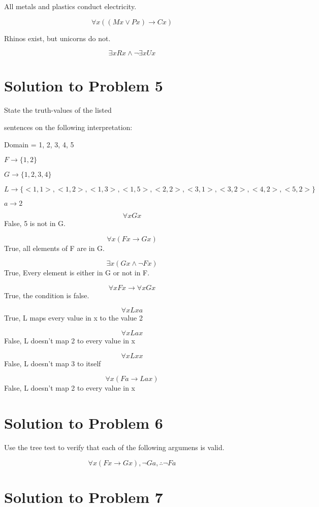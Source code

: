 \documentclass[12pt]{article}
\begin{document}
All metals and plastics conduct electricity.

\[ \forall x ((Mx \lor Px) \rightarrow Cx) \]

Rhinos exist, but unicorns do not.

\[ \exists x Rx \land \neg \exists x Ux \]

\section*{Solution to Problem 5}

State the truth-values of the listed

sentences on the following interpretation:

Domain = {1, 2, 3, 4, 5}


$F \rightarrow \{1, 2\}$

$G \rightarrow \{1, 2, 3, 4\}$

$L \rightarrow \{<1,1>, <1,2>, <1,3>, <1, 5>, <2, 2>, <3, 1>, <3,2>,<4, 2>, <5, 2>\}$

$a \rightarrow 2$

\[ \forall x Gx \]
False, 5 is not in G.

\[ \forall x(Fx \rightarrow Gx) \]
True, all elements of F are in G.

\[ \exists x(Gx \land \lnot Fx) \]
True, Every element is either in G or not in F.

\[ \forall x F x \rightarrow \forall x G x \]
True, the condition is false. 

\[ \forall x Lxa \]
True, L maps every value in x to the value 2

\[ \forall x Lax \]
False, L doesn't map 2 to every value in x

\[ \forall x Lxx \]
False, L doesn't map 3 to itself

\[ \forall x(Fa \rightarrow Lax) \]
False, L doesn't map 2 to every value in x


\section*{Solution to Problem 6}

Use the tree test to verify that each of the following argumens is valid. 

\[ \forall x (Fx \rightarrow Gx), \neg Ga, \therefore \neg Fa \]





\section*{Solution to Problem 7}
\end{document}

